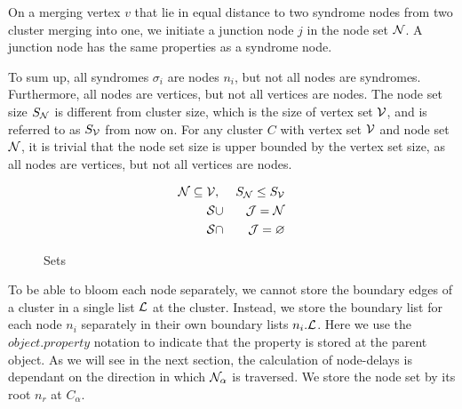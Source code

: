 \begin{lemma}\label{lem:junctionode}
  On a merging vertex $v$ that lie in equal distance to two syndrome nodes from two cluster merging into one, we initiate a junction node $j$ in the node set $\mathcal{N}$. A junction node has the same properties as a syndrome node.
\end{lemma}



To sum up, all syndromes $\sigma_i$ are nodes $n_i$, but not all nodes are syndromes. Furthermore, all nodes are vertices, but not all vertices are nodes. The node set size $S_{\mathcal{N}}$ is different from cluster size, which is the size of vertex set $\mathcal{V}$, and is referred to as $S_{\mathcal{V}}$ from now on. For any cluster $C$ with vertex set $\mathcal{V}$ and node set $\mathcal{N}$, it is trivial that the node set size is upper bounded by the vertex set size, as all nodes are vertices, but not all vertices are nodes.

\begin{eqnarray}\label{eq:upperboundsize}
  \mathcal{N} \subseteq \mathcal{V} &,& S_{\mathcal{N}} \leq S_{\mathcal{V}}  \\
  \nonumber \mathcal{S} &\cup& \mathcal{J} = \mathcal{N} \\
  \nonumber \mathcal{S} &\cap& \mathcal{J} = \varnothing
\end{eqnarray}


\begin{figure}
  \centering
  \caption{Sets}\label{fig:sets}
\end{figure}

To be able to bloom each node separately, we cannot store the boundary edges of a cluster in a single list $\mathcal{L}$ at the cluster. Instead, we store the boundary list for each node $n_i$ separately in their own boundary lists $n_i.\mathcal{L}$. Here we use the $object.property$ notation to indicate that the property is stored at the parent object. As we will see in the next section, the calculation of node-delays is dependant on the direction in which $\mathcal{N}_\alpha$ is traversed. We store the node set by its root $n_r$ at $C_\alpha$. 

